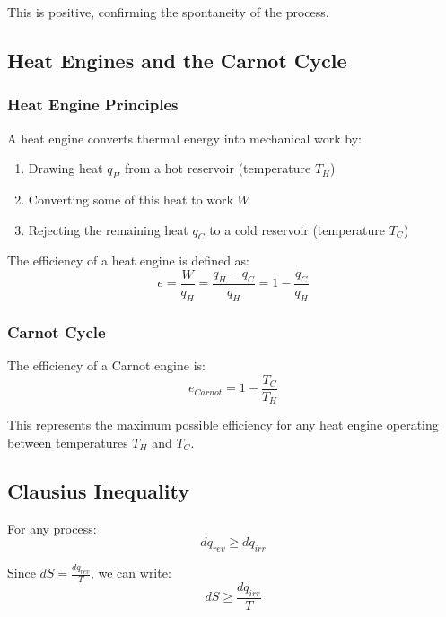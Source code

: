 \documentclass{article}
\theoremstyle{definition}
\begin{document}
This is positive, confirming the spontaneity of the process.

\subsection{Heat Engines and the Carnot Cycle}

\subsubsection{Heat Engine Principles}

A heat engine converts thermal energy into mechanical work by:
\begin{enumerate}
    \item Drawing heat $q_H$ from a hot reservoir (temperature $T_H$)
    \item Converting some of this heat to work $W$
    \item Rejecting the remaining heat $q_C$ to a cold reservoir (temperature $T_C$)
\end{enumerate}

The efficiency of a heat engine is defined as:
\begin{equation}
e = \frac{W}{q_H} = \frac{q_H - q_C}{q_H} = 1 - \frac{q_C}{q_H}
\end{equation}

\subsubsection{Carnot Cycle}

The efficiency of a Carnot engine is:
\begin{equation}
e_{Carnot} = 1 - \frac{T_C}{T_H}
\end{equation}

This represents the maximum possible efficiency for any heat engine operating between temperatures $T_H$ and $T_C$.

\subsection{Clausius Inequality}

For any process:
\begin{equation}
dq_{rev} \geq dq_{irr}
\end{equation}

Since $dS = \frac{dq_{rev}}{T}$, we can write:
\begin{equation}
dS \geq \frac{dq_{irr}}{T}
\end{equation}
\end{document}
